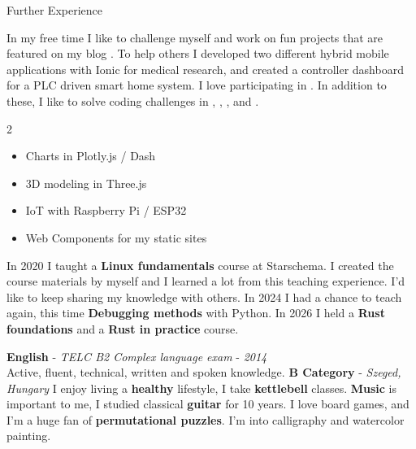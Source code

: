 \customsection
    {Further Experience}
    {\myindent In my free time I like to challenge myself and work on fun projects that are featured on my blog .
    To help others I developed two different hybrid mobile applications with Ionic for medical research,
    and created a controller dashboard for a PLC driven smart home system.
    I love participating in .
    In addition to these, I like to solve coding challenges in
    ,
    ,
    ,
    and .
    \\
    \vspace{-\baselineskip}
        \begin{multicols}{2}
        \begin{itemize}
            \item Charts in Plotly.js / Dash
            \item 3D modeling in Three.js
            \item IoT with Raspberry Pi / ESP32
            \item Web Components for my static sites
        \end{itemize}
        \end{multicols}


    \myindent In 2020 I taught a \textbf{Linux fundamentals} course at Starschema.
    I created the course materials by myself and I learned a lot from this teaching experience.
    I'd like to keep sharing my knowledge with others.
    In 2024 I had a chance to teach again, this time \textbf{Debugging methods} with Python.
    In 2026 I held a \textbf{Rust foundations} and a \textbf{Rust in practice} course.}
%
    {\textbf{English} - \textit{TELC B2 Complex language exam} - \textit{2014} \\
    \myindent\small{Active, fluent, technical, written and spoken knowledge.}}
%
    {\textbf{B Category} - \textit{Szeged, Hungary}}
%
    {I enjoy living a \textbf{healthy} lifestyle, I take \textbf{kettlebell} classes.
    \textbf{Music} is important to me, I studied classical \textbf{guitar} for 10 years.
    I love board games, and I'm a huge fan of \textbf{permutational puzzles}.
    I'm into calligraphy and watercolor painting.}